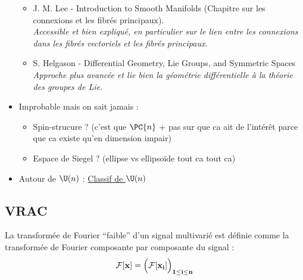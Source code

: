 \begin{itemize}
\begin{itemize}
		\item J. M. Lee - Introduction to Smooth Manifolds (Chapitre sur les connexions et les fibrés principaux).
		\\
		\textit{Accessible et bien expliqué, en particulier sur le lien entre les connexions dans les fibrés vectoriels et les fibrés principaux.}
		
		\item S. Helgason - Differential Geometry, Lie Groups, and Symmetric Spaces
		\\
		\textit{Approche plus avancée et lie bien la géométrie différentielle à la théorie des groupes de Lie.}
	\end{itemize}
	
	\item Improbable mais on sait jamais :
	\begin{itemize}
		\item Spin-strucure ? (c'est que $\PC{n}$ + pas sur que ca ait de l'intérêt parce que ca existe qu'en dimension impair)
		
		\item Espace de Siegel ? (ellipse vs ellipsoïde tout ca tout ca)
	\end{itemize}
	
	\item Autour de $\U(n)$ : \href{https://en.wikipedia.org/wiki/Classifying_space_for_U(n)}{Classif de $\U(n)$}
\end{itemize}




\subsection{VRAC}

\begin{definition}
	La transformée de Fourier ``faible'' d'un signal multivarié est définie comme la transformée de Fourier composante par composante du signal :
	\[\mathcal{F}[\bf{x}] = \Big(\mathcal{F}[x_i]\Big)_{1\leq i\leq n}\]
\end{definition}


